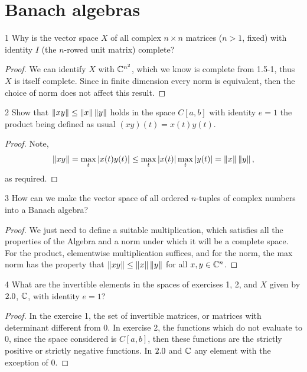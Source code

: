 \section{Banach algebras}


\begin{exercise}{1}
Why is the vector space $X$ of all complex $n \times n$ matrices ($n > 1$, fixed) with identity $I$ (the $n$-rowed unit matrix) complete?
\end{exercise}
\begin{proof}
We can identify $X$ with $\mathbb{C}^{n^2}$, which we know is complete from 1.5-1, thus $X$ is itself complete.
Since in finite dimension every norm is equivalent, then the choice of norm does not affect this result.
\end{proof} 

\begin{exercise}{2}
Show that $\left\lVert x y\right\rVert \leq \left\lVert x\right\rVert \left\lVert y\right\rVert$ holds in the space $C[a,b]$ with identity $e = 1$ the product being defined as usual $(xy)(t) = x(t)y(t)$.
\end{exercise}
\begin{proof}
Note,
\begin{align*}
    \left\lVert x y\right\rVert
    = \max_t \left\lvert x(t) y(t)\right\rvert
    \leq \max_t \left\lvert x(t)\right\rvert \max_t \left\lvert y(t)\right\rvert
    = \left\lVert x\right\rVert\left\lVert y\right\rVert,
\end{align*}
as required.
\end{proof} 

\begin{exercise}{3}
How can we make the vector space of all ordered $n$-tuples of complex numbers into a Banach algebra?
\end{exercise}
\begin{proof}
We just need to define a suitable multiplication, which satisfies all the properties of the Algebra and a norm under which it will be a complete space.
For the product, elementwise multiplication suffices, and for the norm, the max norm has the property that $\left\lVert x y\right\rVert \leq \left\lVert x\right\rVert \left\lVert y\right\rVert$ for all $x, y \in \mathbb{C}^n$.
\end{proof} 

\begin{exercise}{4}
What are the invertible elements in the spaces of exercises 1, 2, and $X$ given by $2.0$, $\mathbb{C}$, with identity $e=1$?
\end{exercise}
\begin{proof}
In the exercise 1, the set of invertible matrices, or matrices with determinant different from 0.
In exercise 2, the functions which do not evaluate to 0, since the space considered is $C[a,b]$, then these functions are the strictly positive or strictly negative functions.
In $2.0$ and $\mathbb{C}$ any element with the exception of 0.
\end{proof} 

